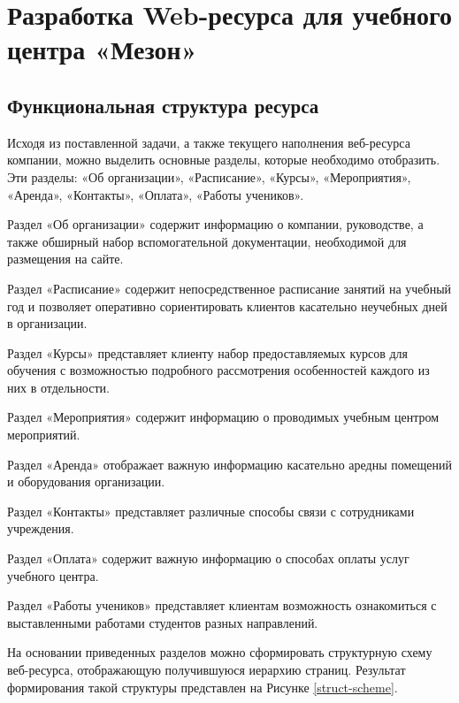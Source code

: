 \section{Разработка Web-ресурса для учебного центра «Мезон»}




\subsection{Функциональная структура ресурса}

Исходя из поставленной задачи, а также текущего наполнения веб-ресурса компании, можно выделить основные разделы, которые необходимо отобразить.
Эти разделы: «Об организации», «Расписание», «Курсы», «Мероприятия», «Аренда», «Контакты», «Оплата», «Работы учеников».

Раздел «Об организации» содержит информацию о компании, руководстве, а также обширный набор вспомогательной документации, необходимой для размещения на сайте.

Раздел «Расписание» содержит непосредственное расписание занятий на учебный год и позволяет оперативно сориентировать клиентов касательно неучебных дней в организации.

Раздел «Курсы» представляет клиенту набор предоставляемых курсов для обучения с возможностью подробного рассмотрения особенностей каждого из них в отдельности.

Раздел «Мероприятия» содержит информацию о проводимых учебным центром мероприятий.

Раздел «Аренда» отображает важную информацию касательно аредны помещений и оборудования организации.

Раздел «Контакты» представляет различные способы связи с сотрудниками учреждения.

Раздел «Оплата» содержит важную информацию о способах оплаты услуг учебного центра.

Раздел «Работы учеников» представляет клиентам возможность ознакомиться с выставленными работами студентов разных направлений.

На основании приведенных разделов можно сформировать структурную схему веб-ресурса, отображающую получившуюся иерархию страниц.
Результат формирования такой структуры представлен на Рисунке \ref{struct-scheme}.


\clearpage
